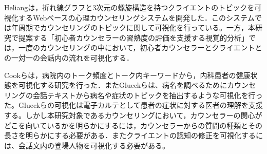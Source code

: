 \documentclass[shuuron]{kuee}
\begin{document}






Heliang\cite{shou}は，折れ線グラフと3次元の螺旋構造を持つクライエントのトピックを可視化するWebベースの心理カウンセリングシステムを開発した．このシステムでは年周期でカウンセリングのトピックに関して可視化を行っている。一方，本研究で提案する「初心者カウンセラーの習熟度の評価を支援する視覚的分析」では，一度のカウンセリングの中において，初心者カウンセラーとクライエントとの一対一の会話内の流れを可視化する．

Cookら\cite{cook2014monologger}は，病院内のトーク頻度とトーク内キーワードから，内科患者の健康状態を可視化する研究を行った．またGlueckら\cite{glueck2018phenolines}は、病名を調べるためにカウンセリングの会話テキストから病名や症状のトピックを抽出するような可視化を行った。Glueckらの可視化は電子カルテとして患者の症状に対する医者の理解を支援する。しかし本研究対象であるカウンセリングにおいて，カウンセラーの関心がどこを向いているかを明らかにするには，カウンセラーからの質問の種類とその長さを明らかにする必要がある．またクライエントの認知の修正を可視化するには、会話文内の登場人物を可視化する必要がある。
\end{document}
